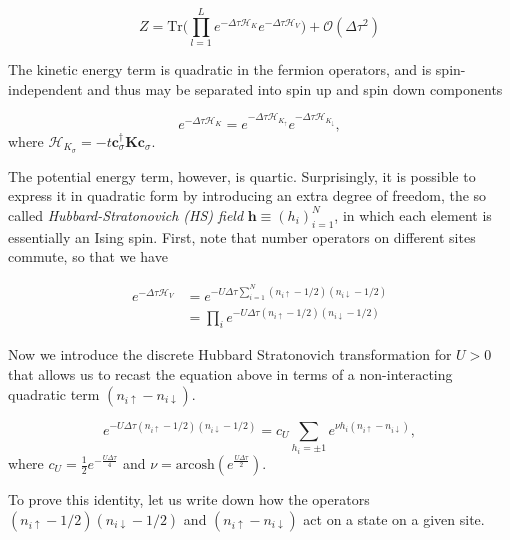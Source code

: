 \documentclass[10pt, twocolumn, twoside]{article}
\begin{document}
\begin{equation}\label{eq:Z_propagator}
Z = \text{Tr} \bigg( \prod_{l=1}^L e^{-\Delta\tau \mathcal{H}_K } e^{-\Delta\tau \mathcal{H}_V } \bigg) + \mathcal{O}(\Delta \tau^2) 
\end{equation}

The kinetic energy term is quadratic in the fermion operators, and is spin-independent and thus may be separated into spin up and spin down components

\begin{equation}
e^{-\Delta\tau \mathcal{H}_K} = e^{-\Delta\tau \mathcal{H}_{K_\uparrow}} e^{-\Delta\tau \mathcal{H}_{K_\downarrow}} ,
\end{equation}
where $\mathcal{H}_{K_\sigma} = -t \bm c_\sigma^\dagger \bm K  \bm c_\sigma$.

The potential energy term, however, is quartic. Surprisingly, it is possible to express it in quadratic form by introducing an extra degree of freedom, the so called \emph{Hubbard-Stratonovich (HS) field} $\bm h \equiv (h_i)_{i=1}^N$, in which each element is essentially an Ising spin. First, note that number operators on different sites commute, so that we have

\begin{equation}
\begin{split}
e^{-\Delta\tau \mathcal{H}_V} &= e^{-U \Delta\tau \sum_{i=1}^N (n_{i\uparrow} - 1/2 ) (n_{i\downarrow} - 1/2 )} \\
&= \prod_i e^{-U \Delta\tau (n_{i\uparrow} - 1/2 ) (n_{i\downarrow} - 1/2 )}
\end{split}
\end{equation}

Now we introduce the discrete Hubbard Stratonovich transformation for $U > 0$ that allows us to recast the equation above in terms of a non-interacting quadratic term $(n_{i\uparrow} - n_{i\downarrow} )$.

\begin{equation}\label{eq:discreteHS}
e^{-U \Delta\tau (n_{i\uparrow} - 1/2 ) (n_{i\downarrow} - 1/2 )} = c_U \sum_{h_i = \pm 1} e^{\nu h_i (n_{i\uparrow} - n_{i\downarrow} )},
\end{equation}
where $c_U = \frac{1}{2} e^{-\frac{U\Delta \tau}{4}}$ and $\nu = \text{arcosh} ( e^{\frac{U\Delta\tau}{2}})$.

To prove this identity, let us write down how the operators  $(n_{i\uparrow} - 1/2 ) (n_{i\downarrow} - 1/2 )$ and $(n_{i\uparrow} - n_{i\downarrow} )$ act on a state on a given site.
\end{document}
